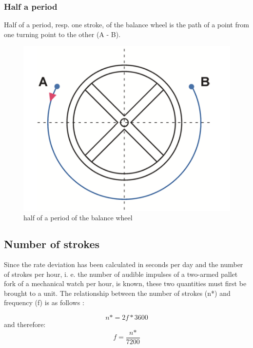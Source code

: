 \documentclass[12pt, a4paper]{report}
\begin{document}
\subsubsection{Half a period}
Half of a period, resp. one stroke, of the balance wheel is the path of a point from one turning point to the other (A - B). \cite{Witschi_basics}
    \begin{figure}[H]
    \centering
    \includegraphics[scale=0.4]{Images/Halfperiod.png}
    
    \caption{half of a period of the balance wheel \cite{Witschi_basics}}
    \end{figure}
\bigskip
    
    \subsection{Number of strokes}
    Since the rate deviation has been calculated in seconds per day and the number of strokes per hour, i. e. the number of audible impulses of a two-armed pallet fork of a mechanical watch per hour, is known, these two quantities must first be brought to a unit. The relationship between the number of strokes (n*) and frequency (f) is as follows \cite{Krug1987}: 
    
    \begin{displaymath}
    n\text{*} = 2f*3600
     \end{displaymath}
     and therefore:
     \begin{displaymath}
      f = \frac{n\text{*}}{7200}
     \end{displaymath}
     
\end{document}
